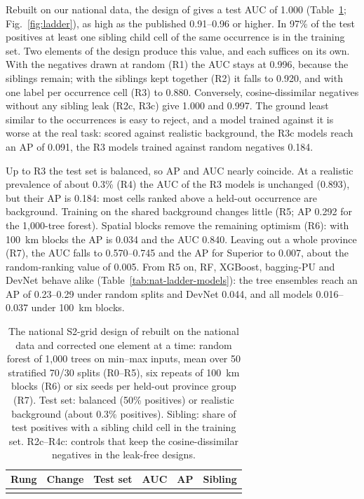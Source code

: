 \documentclass[pdflatex,sn-apa]{sn-jnl}
\begin{document}
Rebuilt on our national data, the design of \citet{Parsa2024} gives a test AUC of 1.000 (Table~\ref{tab:nat-ladder}; Fig.~\ref{fig:ladder}), as high as the published 0.91--0.96 or higher. In 97\% of the test positives at least one sibling child cell of the same occurrence is in the training set. Two elements of the design produce this value, and each suffices on its own. With the negatives drawn at random (R1) the AUC stays at 0.996, because the siblings remain; with the siblings kept together (R2) it falls to 0.920, and with one label per occurrence cell (R3) to 0.880. Conversely, cosine-dissimilar negatives without any sibling leak (R2c, R3c) give 1.000 and 0.997. The ground least similar to the occurrences is easy to reject, and a model trained against it is worse at the real task: scored against realistic background, the R3c models reach an AP of 0.091, the R3 models trained against random negatives 0.184.

Up to R3 the test set is balanced, so AP and AUC nearly coincide. At a realistic prevalence of about 0.3\% (R4) the AUC of the R3 models is unchanged (0.893), but their AP is 0.184: most cells ranked above a held-out occurrence are background. Training on the shared background changes little (R5; AP 0.292 for the 1,000-tree forest). Spatial blocks remove the remaining optimism (R6): with 100~km blocks the AP is 0.034 and the AUC 0.840. Leaving out a whole province (R7), the AUC falls to 0.570--0.745 and the AP for Superior to 0.007, about the random-ranking value of 0.005. From R5 on, RF, XGBoost, bagging-PU and DevNet behave alike (Table~\ref{tab:nat-ladder-models}): the tree ensembles reach an AP of 0.23--0.29 under random splits and DevNet 0.044, and all models 0.016--0.037 under 100~km blocks.

\begin{table}[t]
\caption{The national S2-grid design of \citet{Parsa2024} rebuilt on the national data and corrected one element at a time: random forest of 1,000 trees on min--max inputs, mean over 50 stratified 70/30 splits (R0--R5), six repeats of 100~km blocks (R6) or six seeds per held-out province group (R7). Test set: balanced (50\% positives) or realistic background (about 0.3\% positives). Sibling: share of test positives with a sibling child cell in the training set. R2c--R4c: controls that keep the cosine-dissimilar negatives in the leak-free designs.}\label{tab:nat-ladder}
\scriptsize
\setlength{\tabcolsep}{2.5pt}
\begin{tabular*}{\textwidth}{@{\extracolsep\fill}lp{6.6cm}lccc}
\toprule
Rung & Change & Test set & AUC & AP & Sibling \\
\midrule
\botrule
\end{tabular*}
\end{table}
\end{document}
